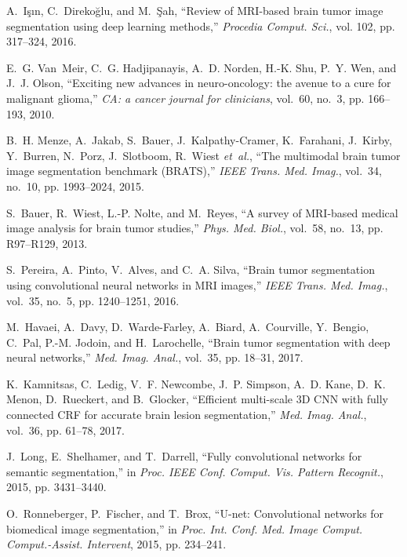 \documentclass[journal,twoside]{IEEEtran}
\begin{document}
\begin{thebibliography}{55}
	
A.~I{\c{s}}{\i}n, C.~Direko{\u{g}}lu, and M.~{\c{S}}ah, ``Review of {MRI}-based brain tumor image segmentation using deep learning methods,'' \emph{Procedia Comput. Sci.}, vol. 102, pp. 317--324, 2016.

E.~G. Van~Meir, C.~G. Hadjipanayis, A.~D. Norden, H.-K. Shu, P.~Y. Wen, and J.~J. Olson, ``Exciting new advances in neuro-oncology: the avenue to a cure for malignant glioma,'' \emph{CA: a cancer journal for clinicians}, vol.~60, no.~3, pp. 166--193, 2010.

B.~H. Menze, A.~Jakab, S.~Bauer, J.~Kalpathy-Cramer, K.~Farahani, J.~Kirby, Y.~Burren, N.~Porz, J.~Slotboom, R.~Wiest \emph{et~al.}, ``The multimodal brain tumor image segmentation benchmark {(BRATS)},'' \emph{IEEE Trans. Med. Imag.}, vol.~34, no.~10, pp. 1993--2024, 2015.

S.~Bauer, R.~Wiest, L.-P. Nolte, and M.~Reyes, ``A survey of {MRI}-based medical image analysis for brain tumor studies,'' \emph{Phys. Med. Biol.}, vol.~58, no.~13, pp. R97--R129, 2013.

S.~Pereira, A.~Pinto, V.~Alves, and C.~A. Silva, ``Brain tumor segmentation using convolutional neural networks in {MRI} images,'' \emph{IEEE Trans. Med. Imag.}, vol.~35, no.~5, pp. 1240--1251, 2016.

M.~Havaei, A.~Davy, D.~Warde-Farley, A.~Biard, A.~Courville, Y.~Bengio, C.~Pal, P.-M. Jodoin, and H.~Larochelle, ``Brain tumor segmentation with deep neural networks,'' \emph{Med. Imag. Anal.}, vol.~35, pp. 18--31, 2017.

K.~Kamnitsas, C.~Ledig, V.~F. Newcombe, J.~P. Simpson, A.~D. Kane, D.~K. Menon, D.~Rueckert, and B.~Glocker, ``Efficient multi-scale {3D} CNN with fully connected {CRF} for accurate brain lesion segmentation,'' \emph{Med. Imag. Anal.}, vol.~36, pp. 61--78, 2017.

J.~Long, E.~Shelhamer, and T.~Darrell, ``Fully convolutional networks for semantic segmentation,'' in \emph{Proc. IEEE Conf. Comput. Vis. Pattern Recognit.}, 2015, pp. 3431--3440.

O.~Ronneberger, P.~Fischer, and T.~Brox, ``U-net: Convolutional networks for biomedical image segmentation,'' in \emph{Proc. Int. Conf. Med. Image Comput. Comput.-Assist. Intervent}, 2015, pp. 234--241.


\end{thebibliography}
\end{document}
